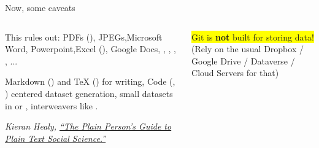 \documentclass[ignorenonframetext, 10pt, aspectratio=169]{beamer}
\begin{document}
\begin{frame}{Now, some caveats}
\begin{columns}[T]
\begin{column}{0.5\textwidth}

  This rules out:
   {\small \pause PDFs (), \pause JPEGs,\pause Microsoft Word, \pause Powerpoint,\pause Excel (), \pause Google Docs, \pause {}, , , , ...}
\pause
  \pause

 {\small Markdown () and TeX () for writing,  \pause Code (, ) centered dataset generation, small datasets in  or , \pause interweavers  like .} \pause

\bigskip
 {\footnotesize \emph{Kieran Healy, \href{https://kieranhealy.org/publications/plain-person-text/}{``The Plain Person’s Guide to Plain Text Social Science.''}}}

\end{column}
\begin{column}{0.5\textwidth}
  \colorbox{yellow}{Git is {\textbf{not}} built for storing data!}\\
\centering
{}
\flushleft
  (Rely on the usual Dropbox / Google Drive / Dataverse / Cloud Servers for that)
\end{column}
\end{columns}
\end{frame}
\end{document}
